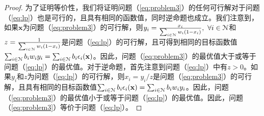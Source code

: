 	\begin{proof}
		为了证明等价性，我们将证明问题（\ref{eq:problem3}）的任何可行解对于问题（\ref{eq:lp}）也是可行的，且具有相同的函数值，同时逆命题也成立。我们注意到，如果$\mathbf{x}$为问题（\ref{eq:problem3}）的可行解，则$y_i=\frac{x_i}{\sum_{i\in\mathcal{N}}w_i(1-x_i)},~\forall i\in\mathcal{N}$和$z=\frac{1}{\sum_{i\in\mathcal{N}}w_i(1-x_i)}$是问题（\ref{eq:lp}）的可行解，且可得到相同的目标函数值$\sum_{i\in\mathcal{N}}b_iw_iy_i=\sum_{i\in\mathcal{N}}b_i\epsilon_i(\mathbf{x})$。因此，问题（\ref{eq:problem3}）的最优值大于或等于问题（\ref{eq:lp}）的最优值。对于逆命题，首先注意到问题（\ref{eq:lp}）中有$z>0$。如果$y_i$和$z$为问题（\ref{eq:lp}）的可行解，则$x_i=y_i/z$是问题（\ref{eq:problem3}）的可行解，且具有相同的目标函数值$\sum_{i\in\mathcal{N}}b_i\epsilon_i(\mathbf{x})=\sum_{i\in\mathcal{N}}b_iw_iy_i$。因此，问题（\ref{eq:problem3}）的最优值小于或等于问题（\ref{eq:lp}）的最优值。因此，问题（\ref{eq:problem3}）等价于问题（\ref{eq:lp}）。
	\end{proof}
	
